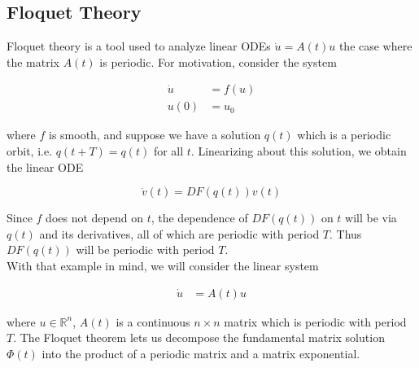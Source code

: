 \documentclass{article}
\def\R{{\mathbb R}}
\begin{document}





\subsection{Floquet Theory}

Floquet theory is a tool used to analyze linear ODEs $\dot{u} = A(t) u$ the case where the matrix $A(t)$ is periodic. For motivation, consider the system

\begin{align*}
\dot{u} &= f(u) \\
u(0) &= u_0
\end{align*}

where $f$ is smooth, and suppose we have a solution $q(t)$ which is a periodic orbit, i.e. $q(t + T) = q(t)$ for all $t$. Linearizing about this solution, we obtain the linear ODE

\[
\dot{v}(t) = DF(q(t)) v(t)
\]

Since $f$ does not depend on $t$, the dependence of $DF(q(t))$ on $t$ will be via $q(t)$ and its derivatives, all of which are periodic with period $T$. Thus $DF(q(t))$ will be periodic with period $T$. \\

With that example in mind, we will consider the linear system

\begin{align*}
\dot{u} &= A(t) u
\end{align*}

where $u \in \R^n$, $A(t)$ is a continuous $n \times n$ matrix which is periodic with period $T$. The Floquet theorem lets us decompose the fundamental matrix solution $\Phi(t)$ into the product of a periodic matrix and a matrix exponential.\\
\end{document}
